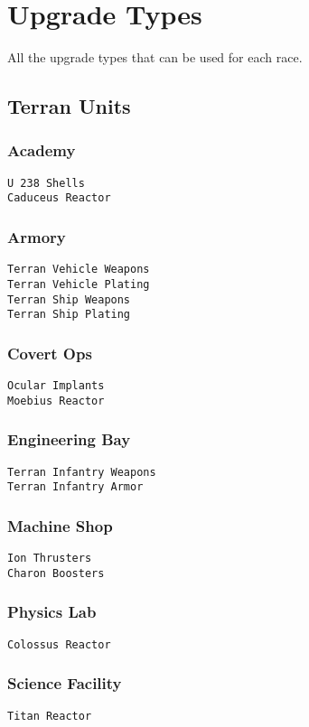 \chapter{Upgrade Types}
\label{upgradetype}
All the upgrade types that can be used for each race. 

\section{Terran Units}

\subsection{Academy}
\verb|U 238 Shells| \\
\verb|Caduceus Reactor|

\subsection{Armory}
\verb|Terran Vehicle Weapons|\\
\verb|Terran Vehicle Plating|\\
\verb|Terran Ship Weapons|\\
\verb|Terran Ship Plating|

\subsection{Covert Ops}
\verb|Ocular Implants|\\
\verb|Moebius Reactor|

\subsection{Engineering Bay}
\verb|Terran Infantry Weapons|\\
\verb|Terran Infantry Armor|

\subsection{Machine Shop}
\verb|Ion Thrusters|\\
\verb|Charon Boosters|

\subsection{Physics Lab}
\verb|Colossus Reactor|

\subsection{Science Facility}
\verb|Titan Reactor|

